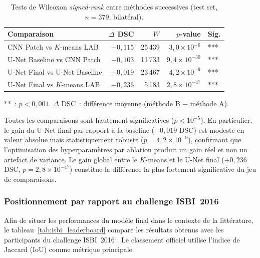 \documentclass[12pt,a4paper]{article}
\begin{document}
\begin{table}[H]
\centering
\caption{Tests de Wilcoxon \emph{signed-rank} entre méthodes successives (test set, $n = 379$, bilatéral).}
\label{tab:wilcoxon}
\begin{tabular}{l r r r l}
\toprule
\textbf{Comparaison} & \textbf{$\Delta$ DSC} & \textbf{$W$} & \textbf{$p$-value} & \textbf{Sig.} \\
\midrule
CNN Patch vs $K$-means LAB       & $+0{,}115$ & 25\,439 & $3{,}0 \times 10^{-6}$  & *** \\
U-Net Baseline vs CNN Patch      & $+0{,}103$ & 11\,733 & $9{,}4 \times 10^{-30}$ & *** \\
U-Net Final vs U-Net Baseline    & $+0{,}019$ & 23\,467 & $4{,}2 \times 10^{-9}$  & *** \\
U-Net Final vs $K$-means LAB     & $+0{,}236$ & 5\,183  & $2{,}8 \times 10^{-47}$ & *** \\
\bottomrule
\end{tabular}

\smallskip
{\footnotesize ***~: $p < 0{,}001$. $\Delta$ DSC~: différence moyenne (méthode B $-$ méthode A).}
\end{table}

Toutes les comparaisons sont hautement significatives ($p < 10^{-5}$). En particulier, le gain du U-Net final par rapport à la baseline ($+0{,}019$ DSC) est modeste en valeur absolue mais statistiquement robuste ($p = 4{,}2 \times 10^{-9}$), confirmant que l'optimisation des hyperparamètres par ablation produit un gain réel et non un artefact de variance. Le gain global entre le $K$-means et le U-Net final ($+0{,}236$ DSC, $p = 2{,}8 \times 10^{-47}$) constitue la différence la plus fortement significative du jeu de comparaisons.

\subsubsection{Positionnement par rapport au challenge ISBI~2016}

Afin de situer les performances du modèle final dans le contexte de la littérature, le tableau~\ref{tab:isbi_leaderboard} compare les résultats obtenus avec les participants du challenge ISBI~2016 \citep{gutman2016isic}. Le classement officiel utilise l'indice de Jaccard (IoU) comme métrique principale.
\end{document}
